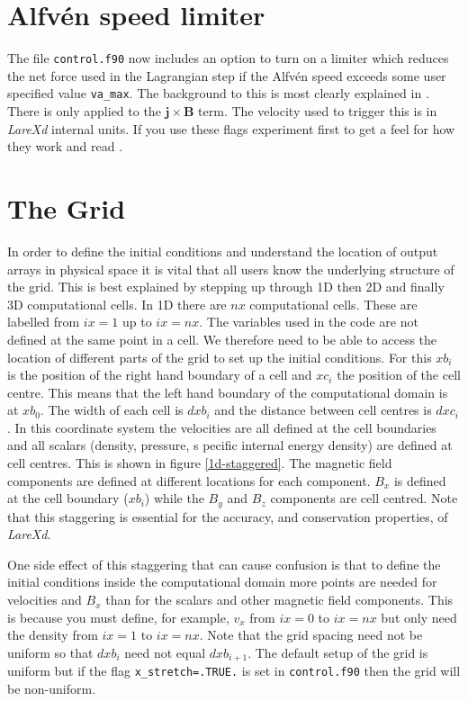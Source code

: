 \documentclass[11pt]{article}
\begin{document}
\section{Alfv\'en speed limiter}
The file \texttt{control.f90} now includes an option to turn on a limiter which reduces the net force used
in the Lagrangian step if the Alfv\'en speed exceeds some user specified value \texttt{va\_max}. The background
to this is most clearly explained in \cite{gombosi:2002}. There is only applied to the 
$\mathbf{j}\times \mathbf{B}$ term. The velocity used to trigger this is in {\it LareXd} internal units. If
you use these flags experiment first to get a feel for how they work and read \cite{gombosi:2002}.


\section{The Grid}
In order to define the initial conditions and understand the location of output arrays in physical space it is vital 
that all users know the underlying structure of the grid. This is best explained by stepping up through 1D then 2D and 
finally 3D computational cells. In 1D there are $nx$ computational cells. These are labelled from $ix=1$ up to $ix=nx$. 
The variables used in the code are not defined at the same point in a cell. We therefore need to be able to access the 
location of different parts of the grid to set up the initial conditions. For this $xb_i$ is the position of the right 
hand boundary of a cell and $xc_i$ the position of the cell centre. This means that the left hand boundary of the 
computational domain is at $xb_0$. The width of each cell is $dxb_i$ and the distance between cell centres is $dxc_i$. 
In this coordinate system the velocities are all defined at the cell boundaries and all scalars (density, pressure, s
pecific internal energy density) are defined at cell centres. This is shown in figure \ref{1d-staggered}. The magnetic 
field components are defined at different locations for each component. $B_x$ is defined at the cell boundary ($xb_i$) 
while the $B_y$ and $B_z$ components are cell centred. Note that this staggering is essential for the accuracy, and 
conservation properties, of {\it LareXd}.

One side effect of this staggering that can cause confusion is that to define the initial conditions inside the 
computational domain more points are needed for velocities and $B_x$ than for the scalars and other magnetic field 
components. This is because you must define, for example, $v_x$ from $ix=0$ to $ix=nx$ but only need the density 
from $ix=1$ to $ix=nx$. Note that the grid spacing need not be uniform so that $dxb_i$ need not equal $dxb_{i+1}$. 
The default setup of the grid is uniform but if the flag \texttt{x\_stretch=.TRUE.} is set in \texttt{control.f90} 
then the grid will be non-uniform.
\end{document}
